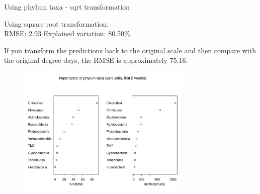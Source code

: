 \documentclass{beamer}
\begin{document}
\begin{frame}{Using phylum taxa - sqrt transformation}

  {\scriptsize
    
  \noindent Using square root transformation:\\
  RMSE: 2.93 \hspace{0.05in}  Explained variation: 80.50\%

  \vspace{0.05in}
  
  \noindent If you transform the predictions back to the original
  scale and then compare with the original degree days, the RMSE is
  approximately 75.16.
  
\begin{center}
\begin{figure}
  \includegraphics[width=3.25in]{../only_phyla/first_two_weeks/sqrt_units_first_two_weeks_phyla_imp_plot}
\end{figure}
\end{center}
\vspace{-0.25in}
}
  
\end{frame}
\end{document}

